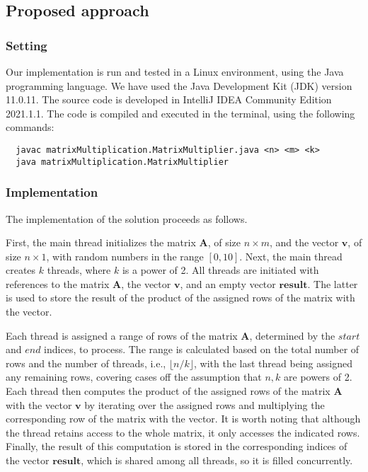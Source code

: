 \documentclass[acmlarge]{acmart}
\begin{document}
\subsection{Proposed approach}

\subsubsection{Setting}
Our implementation is run and tested in a Linux environment, using the Java programming language. We have used the Java Development Kit (JDK) version 11.0.11. The source code is developed in IntelliJ IDEA Community Edition 2021.1.1. The code is compiled and executed in the terminal, using the following commands:
\begin{verbatim}
  javac matrixMultiplication.MatrixMultiplier.java <n> <m> <k>
  java matrixMultiplication.MatrixMultiplier
\end{verbatim}

\subsubsection{Implementation}
The implementation of the solution proceeds as follows. 

First, the main thread initializes the matrix $\mathbf{A}$, of size $n \times m$, and the vector $\mathbf{v}$, of size $n \times 1$, with random numbers in the range $[0, 10]$. Next, the main thread creates $k$ threads, where $k$ is a power of 2. All threads are initiated with references to the matrix $\mathbf{A}$, the vector $\mathbf{v}$, and an empty vector $\mathbf{result}$. The latter is used to store the result of the product of the assigned rows of the matrix with the vector.

Each thread is assigned a range of rows of the matrix $\mathbf{A}$, determined by the $start$ and $end$ indices, to process. The range is calculated based on the total number of rows and the number of threads, i.e., $\lfloor n/k \rfloor$, with the last thread being assigned any remaining rows, covering cases off the assumption that $n,k$ are powers of 2. Each thread then computes the product of the assigned rows of the matrix $\mathbf{A}$ with the vector $\mathbf{v}$ by iterating over the assigned rows and multiplying the corresponding row of the matrix with the vector. It is worth noting that although the thread retains access to the whole matrix, it only accesses the indicated rows. Finally, the result of this computation is stored in the corresponding indices of the vector $\mathbf{result}$, which is shared among all threads, so it is filled concurrently.
\end{document}

